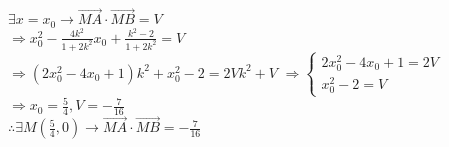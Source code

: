 \begin{minipage}[b][19cm][t]{\textwidth}
\begin{large}
$\exists x=x_0 \rightarrow \vec{MA}\cdot\vec{MB}=V$\hspace{1cm}\\
$\Rightarrow x_0^2-\frac{4k^2}{1+2k^2}x_0+\frac{k^2-2}{1+2k^2}=V$\\
$\Rightarrow (2x_0^2-4x_0+1)k^2+x_0^2-2=2Vk^2+V$
$\Rightarrow \begin{cases}
  2x_0^2-4x_0+1 = 2V \\
  x_0^2-2=V
\end{cases}$ $\Rightarrow x_0=\frac{5}{4},V=-\frac{7}{16}$\\
$\therefore \exists M(\frac{5}{4},0) \rightarrow \vec{MA}\cdot\vec{MB}=-\frac{7}{16}$
\end{large}
\end{minipage}
